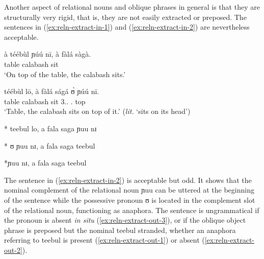 \begin{exe}
\begin{exe}
\begin{exe}
{\begin{exe}
\begin{exe}
\begin{exe}
\begin{exe}
\begin{exe}
\begin{exe}

Another aspect of relational nouns and oblique phrases in general is that they are structurally 
very rigid, that is, they are not easily extracted or preposed. The sentences in  
(\ref{ex:reln-extract-in-1}) and  (\ref{ex:reln-extract-in-2})  are nevertheless acceptable. 


\ea\label{ex:reln-extract}

\ea\label{ex:reln-extract-in-1}
\gll  à téébùl  ɲúú nī, à fàlá sàgà.\\
 {\art } table {\reln} {\postp}  {\art } calabash sit\\
\glt `On top of the table, the calabash sits.'

 \ex\label{ex:reln-extract-in-2}
\gll  téébùl lō, à fàlá ságá ʊ̀   ɲúú nī.\\
 table {\foc} {\art} calabash sit {3.\sg.\poss} {\reln. top} {\postp}\\
\glt `Table, the calabash sits on top of it.' ({\it lit.} `sits on its head')

 \ex\label{ex:reln-extract-out-3}
* teebul lo, a fala saga  ɲuu nɪ

 \ex\label{ex:reln-extract-out-1}
 * ʊ   ɲuu nɪ, a fala saga teebul
 
 \ex\label{ex:reln-extract-out-2}
 *ɲuu nɪ, a fala saga teebul

\z
\z

The sentence in  (\ref{ex:reln-extract-in-2}) is acceptable but odd. It shows
that the nominal complement of the relational noun
{\sls ɲuu} can be uttered at the beginning of the sentence while the possessive
pronoun {\sls ʊ}  is located  in the complement slot of   the relational noun, 
functioning as anaphora. The sentence is ungrammatical if the
pronoun is absent {\it in situ} (\ref{ex:reln-extract-out-3}),  or if the
oblique object phrase is preposed but the nominal {\sls teebul} stranded, 
whether
an anaphora referring to {\sls teebul} is present  
(\ref{ex:reln-extract-out-1}) 
or absent
(\ref{ex:reln-extract-out-2}). 




\end{exe}
\end{exe}
\end{exe}
\end{exe}
\end{exe}
\end{exe}}
\end{exe}
\end{exe}
\end{exe}
